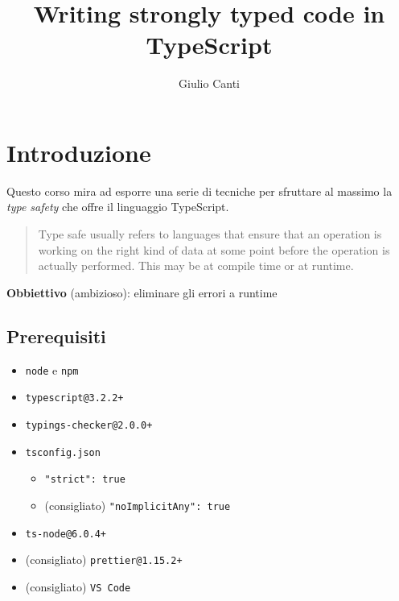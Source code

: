 \documentclass[12pt]{article}
\title{Writing strongly typed code in TypeScript}
\author{Giulio Canti}
\theoremstyle{definition}
\begin{document}
\maketitle

\tableofcontents

\newpage

\section{Introduzione}

Questo corso mira ad esporre una serie di tecniche per sfruttare al massimo la \emph{type safety} che offre il linguaggio TypeScript.

\begin{quote}
Type safe usually refers to languages that ensure that an operation is working on the right kind of data at some point
before the operation is actually performed. This may be at compile time or at runtime.
\end{quote}

\textbf{Obbiettivo} (ambizioso): eliminare gli errori a runtime


\subsection{Prerequisiti}

\begin{itemize}
  \item \texttt{node} e \texttt{npm}
  \item \texttt{typescript@3.2.2+}
  \item \texttt{typings-checker@2.0.0+}
  \item \texttt{tsconfig.json}
    \begin{itemize}
      \item \texttt{"strict": true}
      \item (consigliato) \texttt{"noImplicitAny": true}
    \end{itemize}
  \item \texttt{ts-node@6.0.4+}
  \item (consigliato) \texttt{prettier@1.15.2+}
  \item (consigliato) \texttt{VS Code}
\end{itemize}
\end{document}
